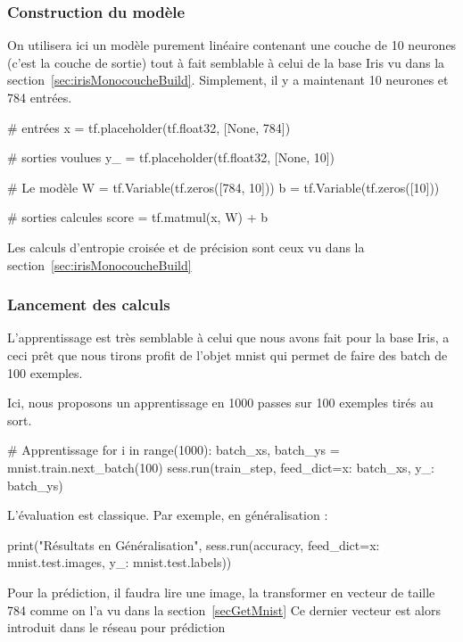 \documentclass[a4paper,11pt]{book}
\begin{document}
\subsubsection{Construction du modèle}
\label{secMnistDnnBuild}

On utilisera ici un modèle purement linéaire contenant une couche de 10 neurones (c'est la couche de sortie) tout à fait semblable à celui de la base Iris vu dans la section~\ref{sec:irisMonocoucheBuild}. Simplement, il y a maintenant 10 neurones et 784 entrées.
 
\begin{mypython}
# entrées
x = tf.placeholder(tf.float32, [None, 784])

# sorties voulues
y_ = tf.placeholder(tf.float32, [None, 10])

# Le modèle
W = tf.Variable(tf.zeros([784, 10]))
b = tf.Variable(tf.zeros([10]))

# sorties calcules 
score = tf.matmul(x, W) + b
\end{mypython}

Les calculs d'entropie croisée et de précision sont ceux vu dans la section~\ref{sec:irisMonocoucheBuild}

\subsubsection{Lancement des calculs}
\label{secMnistDnnRun}

L'apprentissage est très semblable à celui que nous avons fait pour la base Iris, a ceci prêt que nous tirons profit de l'objet mnist qui permet de faire des batch de 100 exemples.

Ici, nous proposons un apprentissage en 1000 passes sur 100 exemples tirés au sort.

\begin{mypython}
# Apprentissage
for i in range(1000):
  batch_xs, batch_ys = mnist.train.next_batch(100)
  sess.run(train_step, feed_dict={x: batch_xs, y_: batch_ys})
\end{mypython}

L'évaluation est classique. Par exemple, en généralisation :
\begin{mypython}
print("Résultats en Généralisation", sess.run(accuracy, feed_dict={x: mnist.test.images, 	y_: mnist.test.labels}))
\end{mypython}

Pour la prédiction, il faudra lire une image, la transformer en vecteur de taille 784 comme on l'a vu dans la section~\ref{secGetMnist}
Ce dernier vecteur est alors introduit dans le réseau pour prédiction
\end{document}

